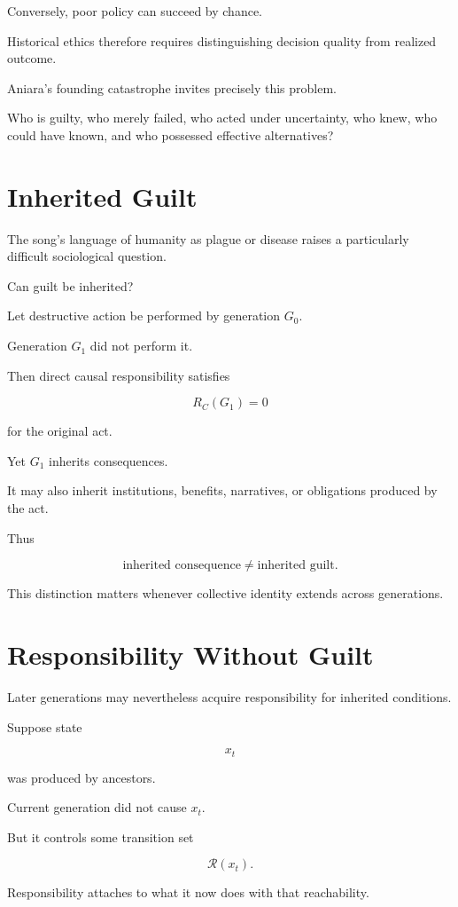 \documentclass[11pt,oneside]{book}
\theoremstyle{definition}
\theoremstyle{remark}
\newcommand{\R}{\mathcal{R}}
\begin{document}
Conversely, poor policy can succeed by chance.

Historical ethics therefore requires distinguishing decision quality from realized outcome.

Aniara's founding catastrophe invites precisely this problem.

Who is guilty, who merely failed, who acted under uncertainty, who knew, who could have known, and who possessed effective alternatives?

\section{Inherited Guilt}

The song's language of humanity as plague or disease raises a particularly difficult sociological question.

Can guilt be inherited?

Let destructive action be performed by generation \(G_0\).

Generation \(G_1\) did not perform it.

Then direct causal responsibility satisfies

\[
R_C(G_1)=0
\]

for the original act.

Yet \(G_1\) inherits consequences.

It may also inherit institutions, benefits, narratives, or obligations produced by the act.

Thus

\[
\text{inherited consequence}
\neq
\text{inherited guilt}.
\]

This distinction matters whenever collective identity extends across generations.

\section{Responsibility Without Guilt}

Later generations may nevertheless acquire responsibility for inherited conditions.

Suppose state

\[
x_t
\]

was produced by ancestors.

Current generation did not cause \(x_t\).

But it controls some transition set

\[
\R(x_t).
\]

Responsibility attaches to what it now does with that reachability.
\end{document}
